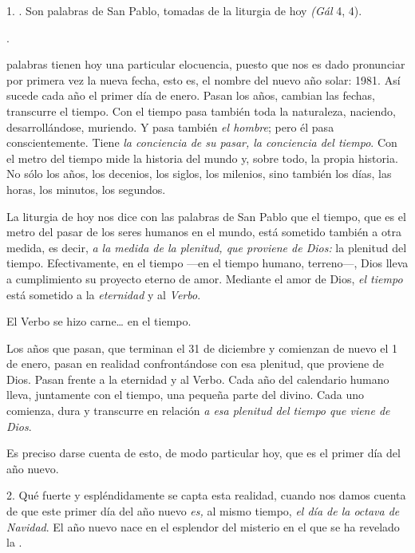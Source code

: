 \begin{body}
	1. . Son palabras de San Pablo, tomadas de la liturgia de hoy \emph{(Gál} 4, 4).
	
	.
	
	 palabras tienen hoy una particular elocuencia, puesto que nos es dado pronunciar por primera vez la nueva fecha, esto es, el nombre del nuevo año solar: 1981. Así sucede cada año el primer día de enero. Pasan los años, cambian las fechas, transcurre el tiempo. Con el tiempo pasa también toda la naturaleza, naciendo, desarrollándose, muriendo. Y pasa también \emph{el hombre}; pero él pasa conscientemente. Tiene \emph{la conciencia de su pasar, la conciencia del tiempo}. Con el metro del tiempo mide la historia del mundo y, sobre todo, la propia historia. No sólo los años, los decenios, los siglos, los milenios, sino también los días, las horas, los minutos, los segundos.
	
	La liturgia de hoy nos dice con las palabras de San Pablo que el tiempo, que es el metro del pasar de los seres humanos en el mundo, está sometido también a otra medida, es decir, \emph{a la medida de la plenitud, que proviene de Dios:} la plenitud del tiempo. Efectivamente, en el tiempo ---en el tiempo humano, terreno---, Dios lleva a cumplimiento su proyecto eterno de amor. Mediante el amor de Dios, \emph{el tiempo} está sometido a la \emph{eternidad} y al \emph{Verbo}.
	
	El Verbo se hizo carne\ldots{} en el tiempo.
	
	Los años que pasan, que terminan el 31 de diciembre y comienzan de nuevo el 1 de enero, pasan en realidad confrontándose con esa plenitud, que proviene de Dios. Pasan frente a la eternidad y al Verbo. Cada año del calendario humano lleva, juntamente con el tiempo, una pequeña parte del  divino. Cada uno comienza, dura y transcurre en relación \emph{a esa plenitud del tiempo que viene de Dios}.
	
	Es preciso darse cuenta de esto, de modo particular hoy, que es el primer día del año nuevo.
	
	2. Qué fuerte y espléndidamente se capta esta realidad, cuando nos damos cuenta de que este primer día del año nuevo \emph{es,} al mismo tiempo, \emph{el día de la octava de Navidad}. El año nuevo nace en el esplendor del misterio en el que se ha revelado la .
	

\end{body}
